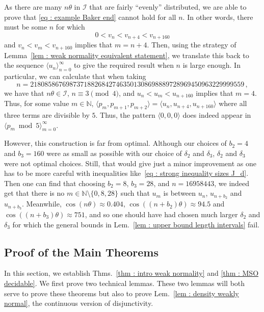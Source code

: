 \documentclass[a4paper,UKenglish,cleveref, autoref, thm-restate]{lipics-v2021}
\newcommand{\nat} {\mathbb{N}}
\begin{document}
As there are many $n\theta$ in $\mathcal{I}$ that are fairly
``evenly'' distributed, we are able to prove that \eqref{eq : example Baker end} cannot hold for all $n$. 
In other words, there must be some $n$ for which
\begin{equation*}
    0 < v_n < v_{n+4} < v_{n+160}
\end{equation*}
and $v_n < v_m < v_{n+160}$ implies that $m = n+4$.
Then, using the strategy of Lemma~\ref{lem : weak normality equivalent statement}, 
we translate this back to the sequence $\langle u_n\rangle_{n=0}^\infty$ to give the required result when $n$ is large enough.
In particular, we can calculate that when taking
\begin{equation*}
    n =218085867698737188268427463501308698889728969450963229999559\,,
\end{equation*}
 we have that $n\theta \in \mathcal{I}$, $n \equiv 3 \pmod 4$, and $u_n < u_m < u_{n+160}$ implies that $m = 4$.
 Thus, for some value $m \in \nat$, $\langle p_m, p_{m+1}, p_{m+2} \rangle = \langle u_n, u_{n+4}, u_{n+160} \rangle$ where all three terms are divisible by $5$.
 Thus, the pattern $\langle 0, 0, 0 \rangle$ does indeed appear in
 $\langle p_m\bmod 5 \rangle_{m=0}^\infty$. 

However, this construction is far from optimal. 
Although our choices of $b_2 = 4$ and $b_3 = 160$ were as small as possible with our choice of $\delta_2$ and $\delta_3$, $\delta_2$ and $\delta_3$ were not optimal choices. 
Still, that would give just a minor improvement as one has to be more careful with inequalities like~\eqref{eq : strong inequality sizes J_d}. 
Then one can find that choosing $b_2 = 8$, $b_3 = 28$, and $n = 16958443$, we indeed get that there is no $m \in \mathbb{N} \setminus\{0, 8, 28\}$ such that $u_m$ is between $u_n$, $u_{n+b_2}$ and $u_{n+b_3}$. 
Meanwhile, $\cos(n\theta) \approx 0.404$, $\cos((n+b_2)\theta) \approx 94.5$ and $\cos((n+b_3)\theta) \approx 751$, and so one should have had chosen much larger $\delta_2$ and $\delta_3$ for which the general bounds in Lem.~\ref{lem : upper bound length intervals} fail.


\subsection{Proof of the Main Theorems}\label{sec : Proof of weak normality}

In this section, we establish Thms.~\ref{thm : intro weak normality} and \ref{thm : MSO decidable}.
We first prove two technical lemmas. 
These two lemmas will both serve to prove these theorems but also to prove Lem.~\ref{lem : density weakly normal}, the continuous version of disjunctivity.
\end{document}
